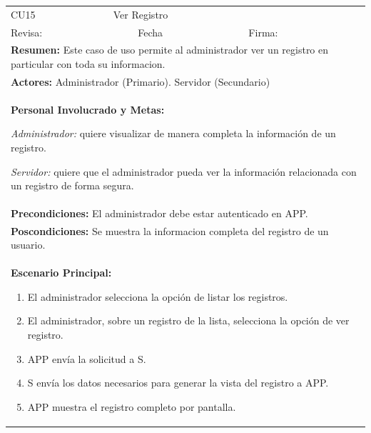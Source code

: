 \begin{longtable}{|l|p{5.5cm}|l|p{2cm}|l|p{1.9cm}|} \hline
    \cellcolor{grisOscuro} CU15 & \multicolumn{4}{|l|}{  \cellcolor{grisOscuro} Ver Registro} &  \cellcolor{grisClaro}\multirow{2}{1cm}{} \\ \cline{1-5}
    \cellcolor{grisOscuro} Revisa: &  \cellcolor{grisClaro} &  \cellcolor{grisOscuro} Fecha &  \cellcolor{grisClaro} &  \cellcolor{grisOscuro} Firma: & \cellcolor{grisClaro} \\ \hline
    \multicolumn{6}{|p{15cm}|}{ \textbf{Resumen: } Este caso de uso permite al administrador ver un registro en particular con toda su informacion.

    } \\ \hline

    \multicolumn{6}{|p{15cm}|}{ \textbf{Actores: } Administrador (Primario). Servidor (Secundario)

    } \\ \hline

    \multicolumn{6}{|p{15cm}|}{ \textbf{Personal Involucrado y Metas: }
    
    \emph{Administrador:} quiere visualizar de manera completa la información de un registro.

    \emph{Servidor:} quiere que el administrador pueda ver la información relacionada con un registro de forma segura.

    } \\ \hline

    \multicolumn{6}{|p{15cm}|}{ \textbf{Precondiciones: } El administrador debe estar autenticado en APP.

    } \\ \hline

    \multicolumn{6}{|p{15cm}|}{ \textbf{Poscondiciones: } Se muestra la informacion completa del registro de un usuario.

    } \\ \hline

    \multicolumn{6}{|p{15cm}|}{ \textbf{Escenario Principal: }

    \begin{enumerate}
        \item El administrador selecciona la opción de listar los registros.
        \item El administrador, sobre un registro de la lista, selecciona la opción de ver registro.
        \item APP envía la solicitud a S.
        \item S envía los datos necesarios para generar la vista del registro a APP.
        \item APP muestra el registro completo por pantalla.
    \end{enumerate}

}
\end{longtable}
